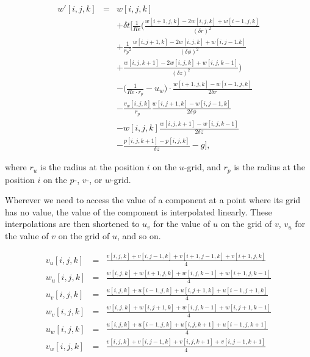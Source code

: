 \documentclass[12pt, a4paper]{article} %
\begin{document}
			\begin{eqnarray}
				w'[i,j,k] &=& w[i,j,k]	\nonumber \\
				&& + \delta t \Bigg[ \frac{1}{Re} \bigg( \frac{w[i+1,j,k]-2w[i,j,k]+w[i-1,j,k]}{(\delta r)^2} \nonumber \\
				&& + \frac{1}{{r_p}^2} \frac{w[i,j+1,k]-2w[i,j,k]+w[i,j-1.k]}{(\delta\phi)^2} \nonumber \\
				&& + \frac{w[i,j,k+1]-2w[i,j,k]+w[i,j,k-1]}{(\delta z)^2} \bigg) \nonumber \\
				&& - \bigg(\frac{1}{Re\cdot r_p} - u_w \bigg) \cdot \frac{w[i+1,j,k]-w[i-1,j,k]}{2 \delta r} \nonumber \\
				&& - \frac{v_w[i,j,k]}{r_p} \frac{w[i,j+1,k]-w[i,j-1,k]}{2\delta \phi} \nonumber \\
				&& - w[i,j,k] \frac{w[i,j,k+1]-w[i,j,k-1]}{2\delta z} \nonumber \\
				&& - \frac{p[i,j,k+1]-p[i,j,k]}{\delta z} -g
				\Bigg] ,
				\label{eq:Discrete w}
			\end{eqnarray}
			
			
			where $r_u$ is the radius at the position $i$ on the $u$-grid, and $r_p$ is the radius at the position $i$ on the $p$-, $v$-, or $w$-grid.
			
			Wherever we need to access the value of a component at a point where its grid has no value, the value of the component is interpolated linearly. These interpolations are then shortened to $u_v$ for the value of $u$ on the grid of $v$, $v_u$ for the value of $v$ on the grid of $u$, and so on.
			
			\begin{eqnarray}
				v_u[i,j,k] &=& \frac{v[i,j,k]+v[i,j-1,k]+v[i+1,j-1,k]+v[i+1,j,k]}{4} \nonumber \\
				w_u[i,j,k] &=& \frac{w[i,j,k]+w[i+1,j,k]+w[i,j,k-1]+w[i+1,j,k-1]}{4}	\nonumber \\
				u_v[i,j,k] &=& \frac{u[i,j,k]+u[i-1,j,k]+u[i,j+1,k]+u[i-1,j+1,k]}{4} \nonumber \\
				w_v[i,j,k] &=& \frac{w[i,j,k]+w[i,j+1,k]+w[i,j,k-1]+w[i,j+1,k-1]}{4} \nonumber \\
				u_w[i,j,k] &=& \frac{u[i,j,k]+u[i-1,j,k]+u[i,j,k+1]+u[i-1,j,k+1]}{4} \nonumber \\
				v_w[i,j,k] &=& \frac{v[i,j,k]+v[i,j-1,k]+v[i,j,k+1]+v[i,j-1,k+1]}{4} \nonumber
			\end{eqnarray}
			
\end{document}
